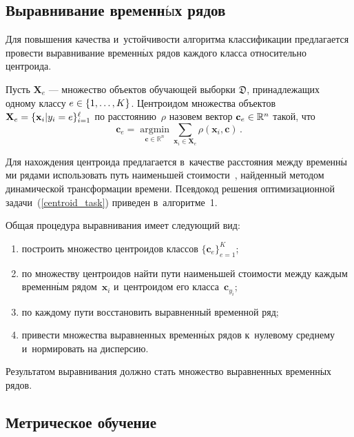 \begin{multicols}{2}
\subsection{Выравнивание временн$\acute{\mbox{ы}}$х рядов}

Для повышения качества и~устойчивости алгоритма классификации предлагается 
провести выравнивание временн$\acute{\mbox{ы}}$х рядов каждого класса относительно центроида.

Пусть $\mathbf{X}_e$ --- множество объектов обучающей выборки $\mathfrak{D}$, 
принадлежащих одному классу $e \hm\in \{1, \dots, K\}$.
Центроидом множества объектов $\mathbf{X}_e \hm= \{\mathbf{x}_i|y_i=e\}_{i=1}^\ell$ 
по расстоянию~$\rho$ назовем вектор $\mathbf{c}_e \hm\in \mathbb{R}^n$ такой, что
\begin{equation}
\label{centroid_task}
    \mathbf{c}_e = \mathop{\mathrm{argmin}}\limits_{{\mathbf{c} 
    \in \mathbb{R}^n}}\sum\limits_{\mathbf{x}_i \in \mathbf{X}_e}
    {\rho(\mathbf{x}_i ,\mathbf{c})}\,.
\end{equation}

Для нахождения центроида предлагается в~качестве расстояния между 
временн$\acute{\mbox{ы}}$ми рядами использовать путь наименьшей стоимости~\cite{goncharov2015cost}, 
найден\-ный методом динамической трансформации времени.
Псевдокод решения оптимизационной задачи~(\ref{centroid_task}) приведен 
в~алгоритме~1.



Общая процедура выравнивания имеет сле\-ду\-ющий вид:
\begin{enumerate}[(1)]
    \item
    построить множество центроидов классов $\{\mathbf{c}_e\}_{e = 1}^K$;
    \item
    по множеству центроидов найти пути наименьшей стоимости между каждым
    временн$\acute{\mbox{ы}}$м рядом~$\mathbf{x}_i$ и~центроидом его класса~$\mathbf{c}_{y_i}$;
    \item
    по каждому пути восстановить выравненный временной ряд;
    \item
        привести множества выравненных временн$\acute{\mbox{ы}}$х рядов к~нулевому среднему и~нормировать на дисперсию.
\end{enumerate}

Результатом выравнивания должно стать множество выравненных временн$\acute{\mbox{ы}}$х рядов.

\subsection{Метрическое обучение}


\end{multicols}
